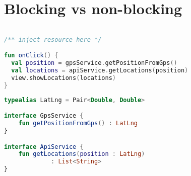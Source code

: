 \documentclass[10pt]{beamer}
\newcommand{\mycomment}[1]{}
\begin{document}
\section{Blocking vs non-blocking}
\begin{frame}[fragile]
\begin{lstlisting}[language=Kotlin, basicstyle=\ttfamily]

/** inject resource here */

fun onClick() {
  val position = gpsService.getPositionFromGps()
  val locations = apiService.getLocations(position)
  view.showLocations(locations)
}
\end{lstlisting}
\end{frame}
\begin{frame}[fragile]
\begin{lstlisting}[language=Kotlin, basicstyle=\ttfamily]
typealias LatLng = Pair<Double, Double>

interface GpsService { 
    fun getPositionFromGps() : LatLng
}

interface ApiService { 
    fun getLocations(position : LatLng) 
             : List<String>
}
\end{lstlisting}
\end{frame}


\mycomment{
\begin{frame}[fragile]
\begin{lstlisting}[language=Kotlin, basicstyle=\ttfamily]
fun onClick(){ 
   val coordinates = /*... put logic here */
   val data = /*... put http client here */
   view.showResults(data) 
}
\end{lstlisting}
\end{frame}
\begin{frame}[fragile]
	\begin{figure}
		\begin{tikzpicture}[scale=1]
\draw [thick,->] (1,6) -- (1,0);
\end{tikzpicture}
	\end{figure}
\end{frame}
}
\end{document}
